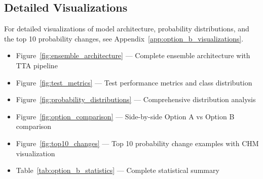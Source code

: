 
\subsection{Detailed Visualizations}

For detailed visualizations of model architecture, probability distributions, and the top 10
probability changes, see Appendix~\ref{app:option_b_visualizations}.

\begin{itemize}
    \item Figure~\ref{fig:ensemble_architecture} — Complete ensemble architecture with TTA pipeline
    \item Figure~\ref{fig:test_metrics} — Test performance metrics and class distribution
    \item Figure~\ref{fig:probability_distributions} — Comprehensive distribution analysis
    \item Figure~\ref{fig:option_comparison} — Side-by-side Option A vs Option B comparison
    \item Figure~\ref{fig:top10_changes} — Top 10 probability change examples with CHM visualization
    \item Table~\ref{tab:option_b_statistics} — Complete statistical summary
\end{itemize}

\pagebreak
